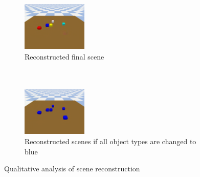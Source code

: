 \begin{figure}
    \hfill
    \begin{subfigure}{0.24\textwidth}
        \centering
        \includegraphics[width=\textwidth]{assets/recons-recon.png}
        \caption{Reconstructed final scene \\ \\ \\}
    \end{subfigure}
    \hfill
    \begin{subfigure}{0.24\textwidth}
        \centering
        \includegraphics[width=\textwidth]{assets/recons-blue.png}
        \caption{Reconstructed scenes if all object types are changed to blue \\}
    \end{subfigure}
    \hfill
    
    \caption{Qualitative analysis of scene reconstruction}
    \label{fig:recons-qual}
\end{figure}



